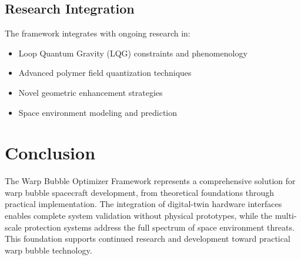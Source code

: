 \documentclass[11pt]{article}
\begin{document}
\subsection{Research Integration}
The framework integrates with ongoing research in:
\begin{itemize}
\item Loop Quantum Gravity (LQG) constraints and phenomenology
\item Advanced polymer field quantization techniques
\item Novel geometric enhancement strategies
\item Space environment modeling and prediction
\end{itemize}

\section{Conclusion}

The Warp Bubble Optimizer Framework represents a comprehensive solution for warp bubble spacecraft development, from theoretical foundations through practical implementation. The integration of digital-twin hardware interfaces enables complete system validation without physical prototypes, while the multi-scale protection systems address the full spectrum of space environment threats. This foundation supports continued research and development toward practical warp bubble technology.
\end{document}
